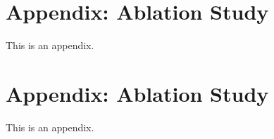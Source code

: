 \documentclass[11pt]{article}
\begin{document}


%



\clearpage
\appendix

\section{Appendix: Ablation Study}
\label{sec:appendixA}
This is an appendix.

\section{Appendix: Ablation Study}
\label{sec:appendixB}
This is an appendix.
\end{document}
